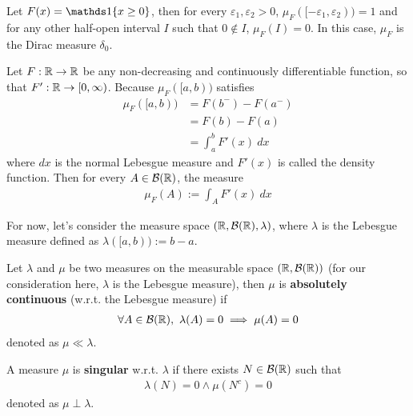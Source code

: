 \documentclass[11pt]{article}
\begin{document}
	\begin{example}
	    Let $F(x) = \id{x \geq 0}$, then for every $\varepsilon_1, \varepsilon_2 > 0$, $\mu_F([-\varepsilon_1, \varepsilon_2)) = 1$ and for any other half-open interval $I$ such that $0 \notin I$, $\mu_F(I) = 0$. In this case, $\mu_F$ is the Dirac measure $\delta_0$.
	\end{example}
	
	\begin{example}
	    Let $F: \mathbb{R} \to \mathbb{R}$ be any non-decreasing and continuously differentiable function, so that $F': \mathbb{R} \to [0, \infty)$.
	    Because $\mu_F([a, b))$ satisfies
	    \begin{align}
	        \mu_F([a, b)) &= F(b^-) - F(a^-) \\
	        &= F(b) - F(a) \\
	        &= \int_a^b F'(x)\ dx
	    \end{align}
	    where $dx$ is the normal Lebesgue measure and $F'(x)$ is called the density function. Then for every $A \in \mathcal{{B}}(\mathbb{R})$, the measure
	    \begin{align}
	        \mu_F(A) := \int_A F'(x)\ dx
	    \end{align}
	\end{example}
	
	\begin{notation}
	    For now, let's consider the measure space $(\mathbb{R}, \mathcal{{B}}(\mathbb{R}), \lambda)$, where $\lambda$ is the Lebesgue measure defined as $\lambda([a, b)) := b - a$.
	\end{notation}
	
	\begin{definition}
	    Let $\lambda$ and $\mu$ be two measures on the measurable space $(\mathbb{R}, \mathcal{{B}}(\mathbb{R}))$ (for our consideration here, $\lambda$ is the Lebesgue measure), then $\mu$ is \textbf{absolutely continuous} (w.r.t. the Lebesgue measure) if
	    \begin{align}
	        \forall A \in \mathcal{{B}}(\mathbb{R}),\ \lambda(A) = 0 \implies \mu(A) = 0
	    \end{align}
	    denoted as $\mu \ll \lambda$.
	\end{definition}
	
	\begin{definition}
	    A measure $\mu$ is \textbf{singular} w.r.t. $\lambda$ if there exists $N \in \mathcal{{B}}(\mathbb{R})$ such that
	    \begin{align}
	        \lambda(N) = 0 \land \mu(N^c) = 0
	    \end{align}
	    denoted as $\mu \perp \lambda$.
	\end{definition}
	
\end{document}
